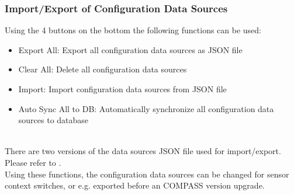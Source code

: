\subsubsection{Import/Export of Configuration Data Sources}
\label{sec:config_ds_export}

Using the 4 buttons on the bottom the following functions can be used:

\begin{itemize}
\item Export All: Export all configuration data sources as JSON file
\item Clear All: Delete all configuration data sources
\item Import: Import configuration data sources from JSON file
\item Auto Sync All to DB: Automatically synchronize all configuration data sources to database
\end{itemize}
\ \\

There are two versions of the data sources JSON file used for import/export. Please refer to . \\

Using these functions, the configuration data sources can be changed for sensor context switches, or e.g. exported before an COMPASS version upgrade.
